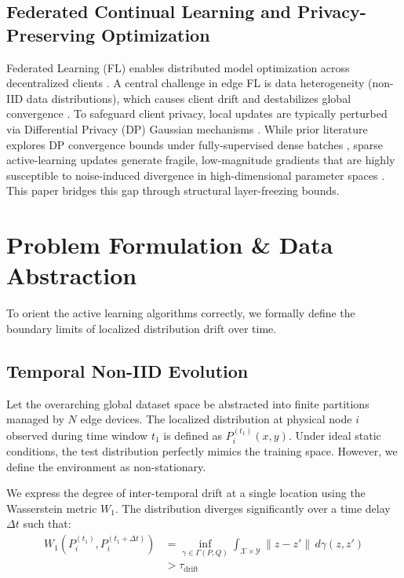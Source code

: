 \documentclass[conference]{IEEEtran}
\begin{document}
\subsection{Federated Continual Learning and Privacy-Preserving Optimization}
Federated Learning (FL) enables distributed model optimization across decentralized clients \cite{b29, b35, b14}. A central challenge in edge FL is data heterogeneity (non-IID data distributions), which causes client drift and destabilizes global convergence \cite{b7, b30}. To safeguard client privacy, local updates are typically perturbed via Differential Privacy (DP) Gaussian mechanisms \cite{b34, b31}. While prior literature explores DP convergence bounds under fully-supervised dense batches \cite{b32}, sparse active-learning updates generate fragile, low-magnitude gradients that are highly susceptible to noise-induced divergence in high-dimensional parameter spaces \cite{b13}. This paper bridges this gap through structural layer-freezing bounds.

\section{Problem Formulation \& Data Abstraction}

To orient the active learning algorithms correctly, we formally define the boundary limits of localized distribution drift over time.

\subsection{Temporal Non-IID Evolution}
Let the overarching global dataset space be abstracted into finite partitions managed by $N$ edge devices. The localized distribution at physical node $i$ observed during time window $t_1$ is defined as $P_{i}^{(t_1)}(x,y)$. Under ideal static conditions, the test distribution perfectly mimics the training space. However, we define the environment as non-stationary.

We express the degree of inter-temporal drift at a single location using the Wasserstein metric $W_1$. The distribution diverges significantly over a time delay $\Delta t$ such that:
\begin{equation}
\begin{aligned}
W_1(P_i^{(t_1)}, P_i^{(t_1 + \Delta t)}) &= \inf_{\gamma \in \Gamma(P, Q)} \int_{\mathcal{X} \times \mathcal{Y}} \|z - z'\| \, d\gamma(z, z') \\
&> \tau_{\mathrm{drift}}
\end{aligned}
\end{equation}
\end{document}
